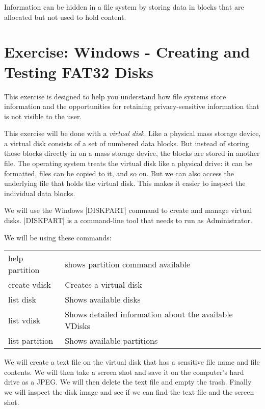 \documentclass[11pt,letter]{book}
\begin{document}
Information can be hidden in a file system by storing data in blocks
that are allocated but not used to hold content\cite{dfrws2005:KnutEcksteinAndMarkoJahnke}. 

\section{Exercise: Windows - Creating and Testing FAT32 Disks}

This exercise is designed to help you understand how file systems
store information and the opportunities for retaining
privacy-sensitive information that is not visible to the user. 

This exercise will be done with a \emph{virtual disk}. Like a physical
mass storage device, a virtual disk consists of a set of numbered data
blocks. But instead of storing those blocks directly in on a mass
storage device, the blocks are stored in another file. The operating
system treats the virtual disk like a physical drive: it can be
formatted, files can be copied to it, and so on. But we can also
access the underlying file that holds the virtual disk. This makes it
easier to inspect the individual data blocks.

We will use the Windows |DISKPART| command to create and manage virtual
disks. |DISKPART| is a command-line tool that needs to run as
Administrator.

We will be using these commands:
\begin{tabular}{ll}
help partition & shows partition command available\\
create vdisk & Creates a virtual disk \\
list disk & Shows available disks \\
list vdisk & Shows detailed information about the available VDisks\\
list partition & Shows available partitions \\
\end{tabular}

We will create a text file on the virtual disk that has a sensitive file
name and file contents. We will then take a screen shot and save it on
the computer's hard drive as a JPEG. We will then delete the text file
and empty the trash. Finally we will inspect the disk image and see if
we can find the text file and the screen shot.
\end{document}
